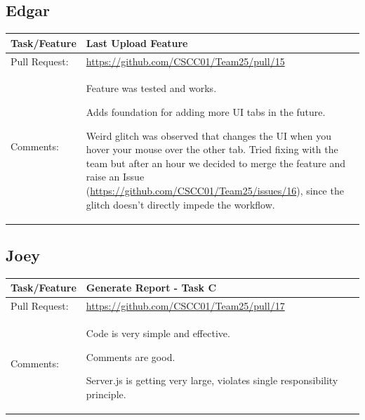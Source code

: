 \documentclass[12pt]{article}
\begin{document}
\subsection{Edgar}
\begin{table}[H]
\begin{tabular}{|p{3cm}|p{11cm}|}
\hline
Task/Feature  & Last Upload Feature
 \\ \hline
Pull Request: & \url{https://github.com/CSCC01/Team25/pull/15}                                                                                                                                                                                                                                                                                                                      \\ \hline
Comments:     & Feature was tested and works.

Adds foundation for adding more UI tabs in the future.

Weird glitch was observed that changes the UI when you hover your mouse over the other tab. Tried fixing with the team but after an hour we decided to merge the feature and raise an Issue (\url{https://github.com/CSCC01/Team25/issues/16}), since the glitch doesn’t directly impede the workflow.
 \\ \hline
\end{tabular}
\end{table}

\subsection{Joey}

\begin{table}[H]
\begin{tabular}{|p{3cm}|p{11cm}|}
\hline
Task/Feature  & Generate Report - Task C
 \\ \hline
Pull Request: & \url{https://github.com/CSCC01/Team25/pull/17}                                                                                                                                                                                                                                                                                                                      \\ \hline
Comments:     & Code is very simple and effective. 

Comments are good.

Server.js is getting very large, violates single responsibility principle.
 \\ \hline
\end{tabular}
\end{table}
\end{document}
